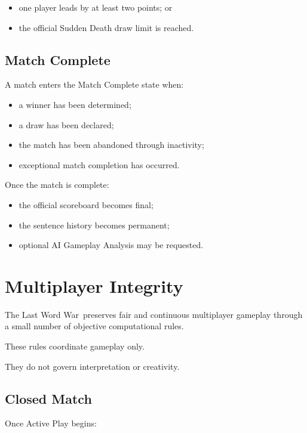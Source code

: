\documentclass[11pt,a4paper]{article}
\begin{document}
\begin{itemize}
    \item one player leads by at least two points; or
    \item the official Sudden Death draw limit is reached.
\end{itemize}

\subsection{Match Complete}

A match enters the Match Complete state when:

\begin{itemize}
    \item a winner has been determined;
    \item a draw has been declared;
    \item the match has been abandoned through inactivity;
    \item exceptional match completion has occurred.
\end{itemize}

Once the match is complete:

\begin{itemize}
    \item the official scoreboard becomes final;
    \item the sentence history becomes permanent;
    \item optional AI Gameplay Analysis may be requested.
\end{itemize}

\section{Multiplayer Integrity}
\label{sec:multiplayer-integrity}

The Last Word War\texttrademark\ preserves fair and continuous multiplayer gameplay through a small number of objective computational rules.

These rules coordinate gameplay only.

They do not govern interpretation or creativity.

\subsection{Closed Match}

Once Active Play begins:
\end{document}
